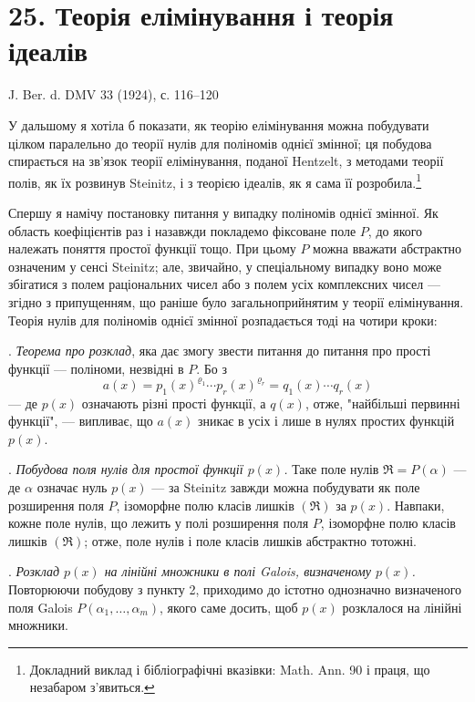 \documentclass[11pt]{article}
\providecommand{\frakR}{\mathfrak R}
\begin{document}
\setcounter{footnote}{0}

\section*{25. Теорія елімінування і теорія ідеалів}

\begin{center}
J. Ber. d. DMV 33 (1924), с. 116--120
\end{center}

У дальшому я хотіла б показати, як теорію елімінування можна побудувати цілком паралельно до теорії нулів для поліномів однієї змінної; ця побудова спирається на зв'язок теорії елімінування, поданої Hentzelt, з методами теорії полів, як їх розвинув Steinitz, і з теорією ідеалів, як я сама її розробила.\footnote{Докладний виклад і бібліографічні вказівки: Math. Ann. 90 і праця, що незабаром з'явиться.}

Спершу я намічу постановку питання у випадку поліномів однієї змінної. Як область коефіцієнтів раз і назавжди покладемо фіксоване поле $P$, до якого належать поняття простої функції тощо. При цьому $P$ можна вважати абстрактно означеним у сенсі Steinitz; але, звичайно, у спеціальному випадку воно може збігатися з полем раціональних чисел або з полем усіх комплексних чисел --- згідно з припущенням, що раніше було загальноприйнятим у теорії елімінування. Теорія нулів для поліномів однієї змінної розпадається тоді на чотири кроки:

. \emph{Теорема про розклад}, яка дає змогу звести питання до питання про прості функції --- поліноми, незвідні в $P$. Бо з
\[
 a(x)=p_1(x)^{\varrho_1}\cdots p_r(x)^{\varrho_r}=q_1(x)\cdots q_r(x)
\]
--- де $p(x)$ означають різні прості функції, а $q(x)$, отже, "найбільші первинні функції", --- випливає, що $a(x)$ зникає в усіх і лише в нулях простих функцій $p(x)$.

. \emph{Побудова поля нулів для простої функції $p(x)$.} Таке поле нулів $\frakR=P(\alpha)$ --- де $\alpha$ означає нуль $p(x)$ --- за Steinitz завжди можна побудувати як поле розширення поля $P$, ізоморфне полю класів лишків $(\frakR)$ за $p(x)$. Навпаки, кожне поле нулів, що лежить у полі розширення поля $P$, ізоморфне полю класів лишків $(\frakR)$; отже, поле нулів і поле класів лишків абстрактно тотожні.

. \emph{Розклад $p(x)$ на лінійні множники в полі Galois, визначеному $p(x)$.} Повторюючи побудову з пункту 2, приходимо до істотно однозначно визначеного поля Galois $P(\alpha_1,\ldots,\alpha_m)$, якого саме досить, щоб $p(x)$ розклалося на лінійні множники.
\end{document}
